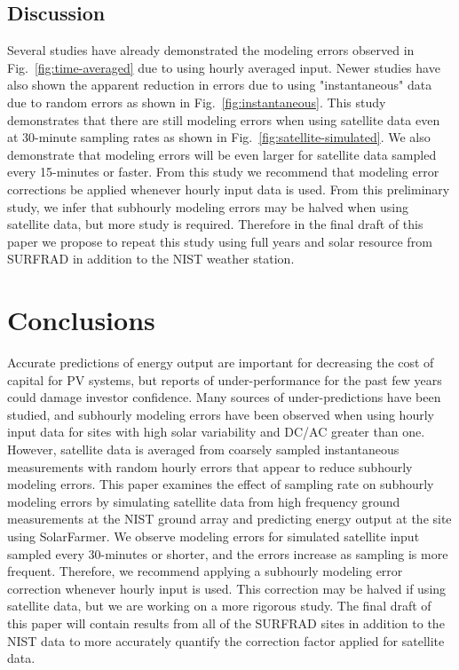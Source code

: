 \documentclass[conference]{IEEEtran}
\begin{document}
\subsection{Discussion}
Several studies have already demonstrated the modeling errors observed in Fig.~\ref{fig:time-averaged} due to using hourly averaged input. Newer studies have also shown the apparent reduction in errors due to using "instantaneous" data due to random errors as shown in Fig.~\ref{fig:instantaneous}. This study demonstrates that there are still modeling errors when using satellite data even at 30-minute sampling rates as shown in Fig.~\ref{fig:satellite-simulated}. We also demonstrate that modeling errors will be even larger for satellite data sampled every 15-minutes or faster. From this study we recommend that modeling error corrections be applied whenever hourly input data is used. From this preliminary study, we infer that subhourly modeling errors may be halved when using satellite data, but more study is required. Therefore in the final draft of this paper we propose to repeat this study using full years and solar resource from SURFRAD in addition to the NIST weather station.

\section{Conclusions}
Accurate predictions of energy output are important for decreasing the cost of capital for PV systems, but reports of under-performance for the past few years could damage investor confidence. Many sources of under-predictions have been studied, and subhourly modeling errors have been observed when using hourly input data for sites with high solar variability and DC/AC greater than one. However, satellite data is averaged from coarsely sampled instantaneous measurements with random hourly errors that appear to reduce subhourly modeling errors. This paper examines the effect of sampling rate on subhourly modeling errors by simulating satellite data from high frequency ground measurements at the NIST ground array and predicting energy output at the site using SolarFarmer. We observe modeling errors for simulated satellite input sampled every 30-minutes or shorter, and the errors increase as sampling is more frequent. Therefore, we recommend applying a subhourly modeling error correction whenever hourly input is used. This correction may be halved if using satellite data, but we are working on a more rigorous study. The final draft of this paper will contain results from all of the SURFRAD sites in addition to the NIST data to more accurately quantify the correction factor applied for satellite data.



\end{document}
